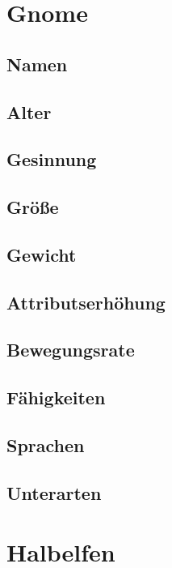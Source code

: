 %

\newpage
\section{Gnome}

\subsection*{Namen}
\subsection*{Alter}
\subsection*{Gesinnung}
\subsection*{Größe}
\subsection*{Gewicht}
\subsection*{Attributserhöhung}
\subsection*{Bewegungsrate}
\subsection*{Fähigkeiten}
\subsection*{Sprachen}
\subsection*{Unterarten}


%

\newpage
\section{Halbelfen}

